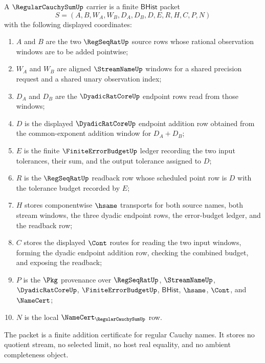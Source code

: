\begin{definition}
\label{def:regular-cauchy-sum-carrier}
A $\RegularCauchySumUp$ carrier is a finite $\mathsf{BHist}$ packet
$$
S=(A,B,W_A,W_B,D_A,D_B,D,E,R,H,C,P,N)
$$
with the following displayed coordinates:
\begin{enumerate}
\item $A$ and $B$ are the two $\RegSeqRatUp$ source rows whose rational observation windows are to be added pointwise;
\item $W_A$ and $W_B$ are aligned $\StreamNameUp$ windows for a shared precision request and a shared unary observation index;
\item $D_A$ and $D_B$ are the $\DyadicRatCoreUp$ endpoint rows read from those windows;
\item $D$ is the displayed $\DyadicRatCoreUp$ endpoint addition row obtained from the common-exponent addition window for $D_A+D_B$;
\item $E$ is the finite $\FiniteErrorBudgetUp$ ledger recording the two input tolerances, their sum, and the output tolerance assigned to $D$;
\item $R$ is the $\RegSeqRatUp$ readback row whose scheduled point row is $D$ with the tolerance budget recorded by $E$;
\item $H$ stores componentwise $\hsame$ transports for both source names, both stream windows, the three dyadic endpoint rows, the error-budget ledger, and the readback row;
\item $C$ stores the displayed $\Cont$ routes for reading the two input windows, forming the dyadic endpoint addition row, checking the combined budget, and exposing the readback;
\item $P$ is the $\Pkg$ provenance over $\RegSeqRatUp$, $\StreamNameUp$, $\DyadicRatCoreUp$, $\FiniteErrorBudgetUp$, $\mathsf{BHist}$, $\hsame$, $\Cont$, and $\NameCert$;
\item $N$ is the local $\NameCert_{\RegularCauchySumUp}$ row.
\end{enumerate}
The packet is a finite addition certificate for regular Cauchy names. It stores no quotient stream, no selected limit, no host real equality, and no ambient completeness object.
\end{definition}

